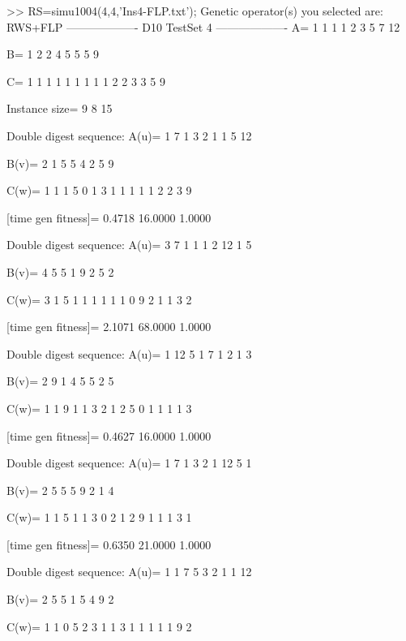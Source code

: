>> RS=simu1004(4,4,'Ins4-FLP.txt');
Genetic operator(s) you selected are:
RWS+FLP
------------------- D10 TestSet 4 -------------------
A=
     1     1     1     1     2     3     5     7    12

B=
     1     2     2     4     5     5     5     9

C=
     1     1     1     1     1     1     1     1     1     2     2     3     3     5     9

Instance size=
     9     8    15

Double digest sequence:
A(u)=
     1     7     1     3     2     1     1     5    12

B(v)=
     2     1     5     5     4     2     5     9

C(w)=
     1     1     1     5     0     1     3     1     1     1     1     1     2     2     3     9

[time gen fitness]=
    0.4718   16.0000    1.0000

Double digest sequence:
A(u)=
     3     7     1     1     1     2    12     1     5

B(v)=
     4     5     5     1     9     2     5     2

C(w)=
     3     1     5     1     1     1     1     1     1     0     9     2     1     1     3     2

[time gen fitness]=
    2.1071   68.0000    1.0000

Double digest sequence:
A(u)=
     1    12     5     1     7     1     2     1     3

B(v)=
     2     9     1     4     5     5     2     5

C(w)=
     1     1     9     1     1     3     2     1     2     5     0     1     1     1     1     3

[time gen fitness]=
    0.4627   16.0000    1.0000

Double digest sequence:
A(u)=
     1     7     1     3     2     1    12     5     1

B(v)=
     2     5     5     5     9     2     1     4

C(w)=
     1     1     5     1     1     3     0     2     1     2     9     1     1     1     3     1

[time gen fitness]=
    0.6350   21.0000    1.0000

Double digest sequence:
A(u)=
     1     1     7     5     3     2     1     1    12

B(v)=
     2     5     5     1     5     4     9     2

C(w)=
     1     1     0     5     2     3     1     1     3     1     1     1     1     1     9     2

